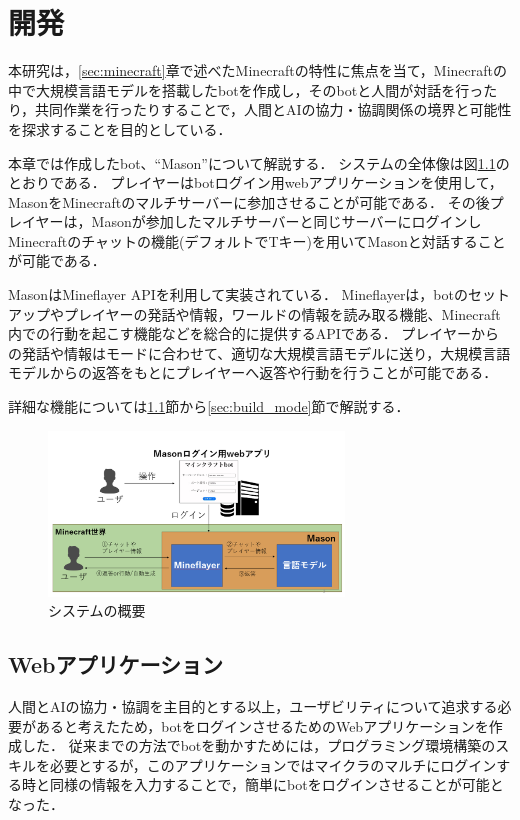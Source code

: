 \chapter{開発} 
\thispagestyle{plain}   %

本研究は，\ref{sec:minecraft}章で述べたMinecraftの特性に焦点を当て，Minecraftの中で大規模言語モデルを搭載したbotを作成し，そのbotと人間が対話を行ったり，共同作業を行ったりすることで，人間とAIの協力・協調関係の境界と可能性を探求することを目的としている．

本章では作成したbot、``Mason''について解説する．
システムの全体像は図\ref{fig:system}のとおりである．
プレイヤーはbotログイン用webアプリケーションを使用して，MasonをMinecraftのマルチサーバーに参加させることが可能である．
その後プレイヤーは，Masonが参加したマルチサーバーと同じサーバーにログインしMinecraftのチャットの機能(デフォルトでTキー)を用いてMasonと対話することが可能である．

MasonはMineflayer API\cite{bib:Mineflayer}を利用して実装されている．
Mineflayerは，botのセットアップやプレイヤーの発話や情報，ワールドの情報を読み取る機能、Minecraft内での行動を起こす機能などを総合的に提供するAPIである．
プレイヤーからの発話や情報はモードに合わせて、適切な大規模言語モデルに送り，大規模言語モデルからの返答をもとにプレイヤーへ返答や行動を行うことが可能である．

詳細な機能については\ref{sec:webapp}節から\ref{sec:build_mode}節で解説する．

\begin{figure}[H]
    \centering
    \includegraphics[width=0.7\textwidth]{fig/my_system.PNG}
    \caption{システムの概要}
    \label{fig:system}
\end{figure}

\section{Webアプリケーション}\label{sec:webapp}
人間とAIの協力・協調を主目的とする以上，ユーザビリティについて追求する必要があると考えたため，botをログインさせるためのWebアプリケーションを作成した．
従来までの方法でbotを動かすためには，プログラミング環境構築のスキルを必要とするが，このアプリケーションではマイクラのマルチにログインする時と同様の情報を入力することで，簡単にbotをログインさせることが可能となった．


